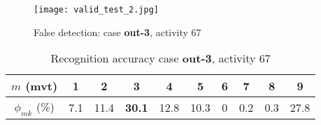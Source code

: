 \documentclass[letterpaper, 10 pt, conference]{ieeeconf}  %
\begin{document}
\begin{figure}[h]
	
		\hspace{-0.3cm}\texttt{[image: valid\_test\_2.jpg]}
		\caption{False detection: case \textbf{out-3}, activity 67} 
		\label{fig:validmodel5}
\end{figure}


	


\begin{table}[h]
\caption{Recognition accuracy case \textbf{out-3}, activity 67}
\label{table2}
\begin{center}
\begin{tabular}{|c||c|c|c|c|c|c|c|c|c|}
\hline
$m$ (mvt) & 1 & 2 & 3 & 4 & 5 & 6 & 7 & 8 & \textbf{9}\\
\hline
$\phi_{mk}$ (\%) & 7.1 &    11.4 &    \textbf{30.1} &    12.8 &     10.3 &    0 &     0.2 &   0.3 &     27.8\\
\hline
\end{tabular}
\end{center}
\end{table}
\end{document}

